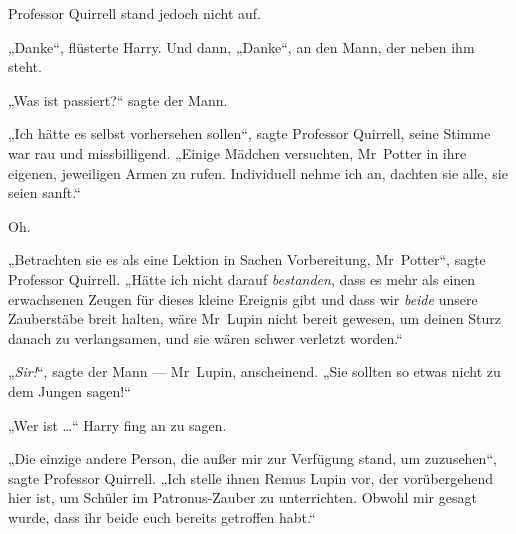 Professor Quirrell stand jedoch nicht auf.

„Danke“, flüsterte Harry. Und dann,
„Danke“, an den Mann, der neben ihm steht.

„Was ist passiert?“ sagte der Mann.

„Ich hätte es selbst vorhersehen sollen“, sagte Professor Quirrell, seine Stimme war rau und missbilligend.
„Einige Mädchen versuchten, Mr~Potter in ihre eigenen, jeweiligen Armen zu rufen. Individuell nehme ich an, dachten sie alle, sie seien sanft.“

Oh.

„Betrachten sie es als eine Lektion in Sachen Vorbereitung, Mr~Potter“, sagte Professor Quirrell.
„Hätte ich nicht darauf \emph{bestanden}, dass es mehr als einen erwachsenen Zeugen für dieses kleine Ereignis gibt und dass wir \emph{beide} unsere Zauberstäbe breit halten, wäre Mr~Lupin nicht bereit gewesen, um deinen Sturz danach zu verlangsamen, und sie wären schwer verletzt worden.“

„\emph{Sir!}“, sagte der Mann — Mr~Lupin, anscheinend.
„Sie sollten so etwas nicht zu dem Jungen sagen!“

„Wer ist …“ Harry fing an zu sagen.

„Die einzige andere Person, die außer mir zur Verfügung stand, um zuzusehen“, sagte Professor Quirrell.
„Ich stelle ihnen Remus Lupin vor, der vorübergehend hier ist, um Schüler im Patronus-Zauber zu unterrichten. Obwohl mir gesagt wurde, dass ihr beide euch bereits getroffen habt.“


